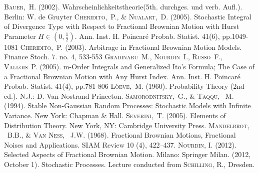 \documentclass[a4paper, twoside, 11pt]{article}
\theoremstyle{definition}
\begin{document}
\fancyhead[LO, RE]{}
\begin{thebibliography}{99}
	 \textsc{Bauer,~H.} (2002). Wahrscheinlichkeitstheorie(5th. durchges. und verb. Aufl.). Berlin: W. de Gruyter
	 \textsc{Cheridito,~P., \& Nualart,~D.} (2005). Stochastic Integral of Divergence Type with Respect to Fractional Brownian Motion with Hurst Parameter $H \in(0, \frac{1}{2})$. Ann. Inst. H. Poincar\'e Probab. Statist. 41(6), pp.1049-1081 
	 \textsc{Cheridito,~P.} (2003). Arbitrage in Fractional Brownian Motion Models. Finance Stoch. 7. no. 4, 533-553
	 \textsc{Gradinaru~M., Nourdin~I., Russo~F., Vallois~P.} (2005). m-Order Integrals and Generalized Ito's Formula; The Case of a Fractional Brownian Motion with Any Hurst Index. Ann. Inst. H. Poincar\'e Probab. Statist. 41(4), pp.781-806 
	 \textsc{L\`oeve,~M.} (1960). Probability Theory (2nd ed.). N.J.: D. Van Nostrand Princeton.
	 \textsc{Samorodnitsky,~G., \& Taqqu, ~M.} (1994). Stable Non-Gaussian Random Processes: Stochastic Models with Infinite Variance. New York: Chapman \& Hall.
	\textsc{Severini,~T.} (2005). Elements of Distribution Theory. New York, NY: Cambridge University Press.
	 \textsc{Mandelbrot, ~B.B., \& Van Ness, ~J.W.} (1968). Fractional Brownian Motions, Fractional Noises and Applications. SIAM Review 10 (4), 422–437.
	 \textsc{Nourdin, I.} (2012). Selected Aspects of Fractional Brownian Motion. Milano: Springer Milan.
	 (2012, October 1). Stochastic Processes. Lecture conducted from \textsc{Schilling, R.}, Dresden.
\end{thebibliography}
\newpage
\end{document}
